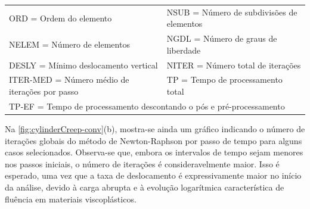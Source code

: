 \documentclass[Tese.tex]{subfiles}
\begin{document}
{\begin{table}[!h]
{\begin{tabular}{ccccccccc}
			\multicolumn{5}{l}{ORD = Ordem do elemento} & \multicolumn{4}{l}{NSUB = Número de subdivisões de elementos}\\
			\multicolumn{5}{l}{NELEM = Número de elementos} & \multicolumn{4}{l}{NGDL = Número de graus de liberdade} \\
			\multicolumn{5}{l}{DESLY = Mínimo deslocamento vertical} & \multicolumn{4}{l}{NITER = Número total de iterações} \\
			\multicolumn{5}{l}{ITER-MED = Número médio de iterações por passo} & \multicolumn{4}{l}{TP = Tempo de processamento total}  \\
			\multicolumn{9}{l}{TP-EF = Tempo de processamento descontando o pós e pré-processamento} \\
			\hline 
		\end{tabular}
	}
\end{table}

Na \cref{fig:cylinderCreep-conv}(b), mostra-se ainda um gráfico indicando o número de iterações globais do método de Newton-Raphson por passo de tempo para alguns casos selecionados. Observa-se que, embora os intervalos de tempo sejam menores nos passos iniciais, o número de iterações é consideravelmente maior. Isso é esperado, uma vez que a taxa de deslocamento é expressivamente maior no início da análise, devido à carga abrupta e à evolução logarítmica característica de fluência em materiais viscoplásticos. 

}
\end{document}
